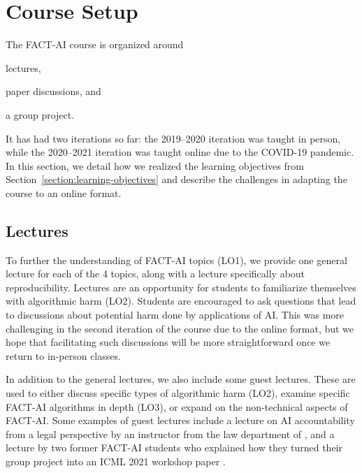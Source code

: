 
\pagebreak
\section{Course Setup}
\label{section:coursesetup}

The FACT-AI course is organized around 
\begin{enumerate*}[label=(\roman*)]
    \item lectures, 
    \item paper discussions, and
    \item a group project. 
\end{enumerate*}
It has had two iterations so far: the 2019--2020 iteration was taught in person, while the 2020--2021 iteration was taught online due to the COVID-19 pandemic. 
In this section, we detail how we realized the learning objectives from Section~\ref{section:learning-objectives} and describe the challenges in adapting the course to an online format.

\subsection{Lectures}
To further the understanding of FACT-AI topics (LO1), we provide one general lecture for each of the 4 topics, along with a lecture specifically about reproducibility.
Lectures are an opportunity for students to familiarize themselves with algorithmic harm (LO2). Students are encouraged to ask questions that lead to discussions about potential harm done by applications of AI. 
This was more challenging in the second iteration of the course due to the online format, but we hope that facilitating such discussions will be more straightforward once we return to in-person classes. 

In addition to the general lectures, we also include some guest lectures. 
These are used to either discuss specific types of algorithmic harm (LO2), examine specific FACT-AI algorithms in depth (LO3), or expand on the non-technical aspects of FACT-AI. 
Some examples of guest lectures include a lecture on AI accountability from a legal perspective by an instructor from the law department of \OurUniversity{}, and a lecture by two former FACT-AI students who explained how they turned their group project into an ICML 2021 workshop paper \cite{neely2021order}. 

